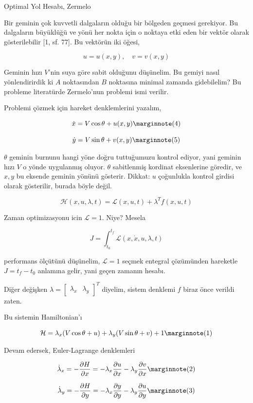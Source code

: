 \documentclass[12pt,fleqn]{article}\usepackage{../../common}
\begin{document}
Optimal Yol Hesabı, Zermelo

Bir geminin çok kuvvetli dalgaların olduğu bir bölgeden geçmesi
gerekiyor. Bu dalgaların büyüklüğü ve yönü her nokta için o noktaya
etki eden bir vektör olarak gösterilebilir [1, sf. 77]. Bu vektörün
iki öğesi, 

$$
u = u(x,y), \quad v = v(x,y)
$$

Geminin hızı $V$'nin suya göre sabit olduğunu düşünelim. Bu gemiyi
nasıl yönlendirirdik ki $A$ noktasından $B$ noktasına minimal zamanda
gidebilelim? Bu probleme literatürde Zermelo'nun problemi ismi verilir. 

Problemi çözmek için hareket denklemlerini yazalım, 

$$
\dot{x} = V \cos\theta + u(x,y)
\mlabel{4}
$$

$$
\dot{y} = V \sin\theta + v(x,y)
\mlabel{5}
$$

$\theta$ geminin burnunu hangi yöne doğru tuttuğumuzu kontrol ediyor,
yani geminin hızı $V$ o yönde uygulanmış oluyor. $\theta$ sabitlenmiş
kordinat eksenlerine göredir, ve $x,y$ bu eksende geminin yönünü
gösterir.  Dikkat: $u$ çoğunlukla kontrol girdisi olarak gösterilir,
burada böyle değil.

$$
\mathcal{H}(x, u, \lambda, t) = \mathcal{L}( x, u, t) + \lambda^T f(x, u, t) 
$$

Zaman optimizasyonu icin $\mathcal{L} = 1$. Niye? Mesela

$$
J = \int_{t_0}^{t_f} \mathcal{L}( x, \dot{x}, u, \lambda, t)
$$

performans ölçütünü düşünelim, $\mathcal{L} = 1$ seçmek entegral
çözümünden hareketle $J = t_f - t_0$ anlamına gelir, yani geçen
zamanın hesabı.

Diğer değişken $\lambda =
\left[\begin{array}{cc} \lambda_x & \lambda_y \end{array}\right]^T$
diyelim, sistem denklemi $f$ biraz önce verildi zaten.

Bu sistemin Hamiltonian'ı 

$$
\mathcal{H} = 
\lambda_x (V \cos \theta + u ) + 
\lambda_y (V \sin \theta + v ) + 1
\mlabel{1}
$$

Devam edersek, Euler-Lagrange denklemleri

$$
\dot{\lambda}_x = -\frac{\partial H}{\partial x }  = 
-\lambda_x \frac{\partial u}{\partial x} - 
 \lambda_y \frac{\partial v}{\partial x}
\mlabel{2}
$$

$$
\dot{\lambda}_y = -\frac{\partial H}{\partial y}  = 
-\lambda_x \frac{\partial y}{\partial y} - 
 \lambda_y \frac{\partial u}{\partial y}
\mlabel{3}
$$
\end{document}
